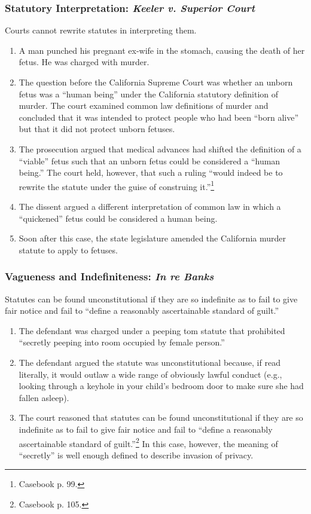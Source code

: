 \subsubsection{Statutory Interpretation: \emph{Keeler v. Superior Court}}

Courts cannot rewrite statutes in interpreting them.

\begin{enumerate}
    \item A man punched his pregnant ex-wife in the stomach, causing the death 
    of her fetus. He was charged with murder.
    \item The question before the California Supreme Court was whether an 
    unborn fetus was a ``human being'' under the California statutory 
    definition of murder. The court examined common law definitions of 
    murder and concluded that it was intended to protect people who had been 
    ``born alive'' but that it did not protect unborn fetuses.
    \item The prosecution argued that medical advances had shifted the 
    definition of a ``viable'' fetus such that an unborn fetus could be 
    considered a ``human being.'' The court held, however, that such a ruling 
    ``would indeed be to rewrite the statute under the guise of construing 
    it.''\footnote{Casebook p. 99.}
    \item The dissent argued a different interpretation of common law in which 
    a ``quickened'' fetus could be considered a human being.
    \item Soon after this case, the state legislature amended the California 
    murder statute to apply to fetuses.
\end{enumerate}

\subsubsection{Vagueness and Indefiniteness: \emph{In re Banks}}

Statutes can be found unconstitutional if they are so indefinite as to fail to 
give fair notice and fail to ``define a reasonably ascertainable standard of 
guilt.''

\begin{enumerate}
    \item The defendant was charged under a peeping tom statute that 
    prohibited ``secretly peeping into room occupied by female person.''
    \item The defendant argued the statute was unconstitutional because, if 
    read literally, it would outlaw a wide range of obviously lawful conduct 
    (e.g., looking through a keyhole in your child's bedroom door to make sure 
    she had fallen asleep).
    \item The court reasoned that statutes can be found unconstitutional if 
    they are so indefinite as to fail to give fair notice and fail to ``define 
    a reasonably ascertainable standard of guilt.''\footnote{Casebook p. 105.} 
    In this case, however, the meaning of ``secretly'' is well enough defined 
    to describe invasion of privacy.
\end{enumerate}

